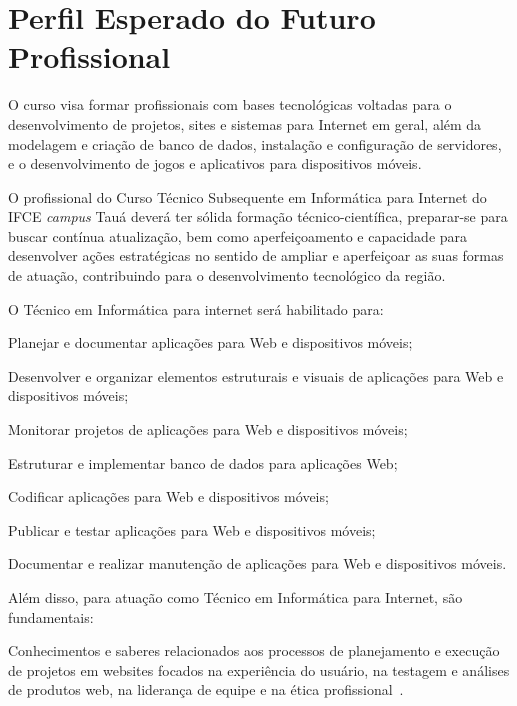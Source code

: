 \documentclass[
	12pt,				%
	openright,			%
	twoside,			%
	a4paper,			%
	chapter=TITLE,		%
	english,			%
	french,				%
	spanish,			%
	brazil,				%
	]{abntex2}
\begin{document}
\section{Perfil Esperado do Futuro Profissional}


O curso visa formar profissionais com bases tecnológicas voltadas para o desenvolvimento de projetos, sites e sistemas para Internet em geral, além da modelagem e criação de banco de dados, instalação e configuração de servidores, e o desenvolvimento de jogos e aplicativos para dispositivos móveis.

O profissional do Curso Técnico Subsequente em Informática para Internet do IFCE \textit{campus} Tauá deverá ter sólida formação técnico-científica, preparar-se para buscar contínua atualização, bem como aperfeiçoamento e capacidade para desenvolver ações estratégicas no sentido de ampliar e aperfeiçoar as suas formas de atuação, contribuindo para o desenvolvimento tecnológico da região.


O Técnico em Informática para internet será habilitado para:
\begin{alineas}
	\item Planejar e documentar aplicações para Web e dispositivos móveis;
	\item Desenvolver e organizar elementos estruturais e visuais de aplicações para Web e dispositivos móveis;
	\item Monitorar projetos de aplicações para Web e dispositivos móveis;
	\item Estruturar e implementar banco de dados para aplicações Web;
	\item Codificar aplicações para Web e dispositivos móveis;
	\item Publicar e testar aplicações para Web e dispositivos móveis;
	\item Documentar e realizar manutenção de aplicações para Web e dispositivos móveis.
\end{alineas}

Além disso, para atuação como Técnico em Informática para Internet, são fundamentais:

\begin{citacao}
Conhecimentos e saberes relacionados aos processos de planejamento e execução de projetos em websites focados na experiência do usuário, na testagem e análises de produtos web, na liderança de equipe e na ética profissional~\cite{catalog}.
\end{citacao}
 
\end{document}

